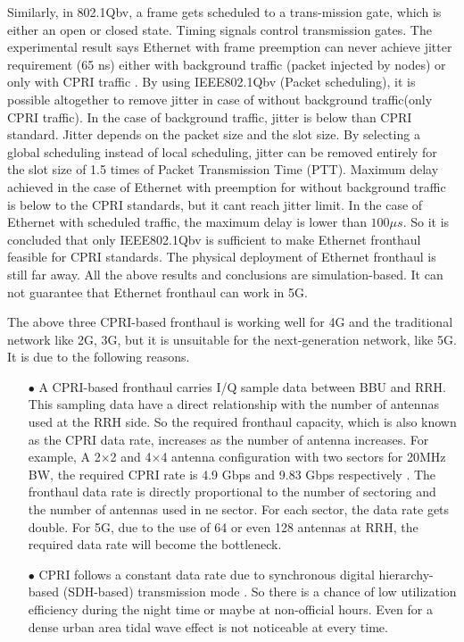 \begin{multicols}{2}
\begin{itemize}
Similarly, in 802.1Qbv, a frame gets scheduled to a trans-mission gate, which is either an open or closed state. Timing signals control transmission gates. The experimental result says Ethernet with frame preemption can never achieve jitter requirement (65 ns) either with background traffic (packet injected by nodes) or only with CPRI traffic \cite{art3-key50}. By using IEEE802.1Qbv (Packet scheduling), it is possible altogether to remove jitter in case of without background traffic(only CPRI traffic). In the case of background traffic, jitter is below than CPRI standard. Jitter depends on the packet size and the slot size. By selecting a global scheduling instead of local scheduling, jitter can be removed entirely for the slot size of 1.5 times of Packet Transmission Time (PTT). Maximum delay achieved in the case of Ethernet with preemption for without background traffic is below to the CPRI standards, but it cant reach jitter limit. In the case of Ethernet with scheduled traffic, the maximum delay is lower than $100 \mu s$. So it is concluded that only IEEE802.1Qbv is sufficient to make Ethernet fronthaul feasible for CPRI standards. The physical deployment of Ethernet fronthaul is still far away. All the above results and conclusions are simulation-based. It can not guarantee that Ethernet fronthaul can work in 5G. 

The above three CPRI-based fronthaul is working well for 4G and the traditional network like 2G, 3G, but it is unsuitable for the next-generation network, like 5G. It is due to the following reasons.

\begin{itemize}

\item[$\bullet$] A CPRI-based fronthaul carries I/Q sample data between BBU and RRH. This sampling data have a direct relationship with the number of antennas used at the RRH side. So the required fronthaul capacity, which is also known as the CPRI data rate, increases as the number of antenna increases. For example, A 2$\times$2 and 4$\times$4 antenna configuration with two sectors for 20MHz BW, the required CPRI rate is 4.9 Gbps and 9.83 Gbps respectively \cite{art3-key39}. The fronthaul data rate is directly proportional to the number of sectoring and the number of antennas used in ne sector. For each sector, the data rate gets double. For 5G, due to the use of 64 or even 128 antennas at RRH, the required data rate will become the bottleneck.

\item[$\bullet$] CPRI follows a constant data rate due to synchronous digital hierarchy-based (SDH-based) transmission mode \cite{art3-key35}. So there is a chance of low utilization efficiency during the night time or maybe at non-official hours. Even for a dense urban area tidal wave effect is not noticeable at every time.


\end{itemize}
\end{itemize}
\end{multicols}
